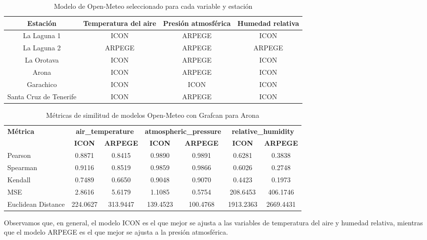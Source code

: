 \begin{table}[htb]
    \small
    \centering
    \begin{tabular}{|c|c|c|c|}
        \hline
        Estación & Temperatura del aire & Presión atmosférica & Humedad relativa \\
        \hline
        La Laguna 1 & ICON & ARPEGE & ICON \\
        La Laguna 2 & ARPEGE & ARPEGE & ARPEGE \\
        La Orotava & ICON & ARPEGE & ICON \\
        Arona & ICON & ARPEGE & ICON \\
        Garachico & ICON & ICON & ICON \\
        Santa Cruz de Tenerife & ICON & ARPEGE & ICON \\
        \hline
    \end{tabular}
    \caption{Modelo de Open-Meteo seleccionado para cada variable y estación}
    \label{tabla_modelos_seleccionados}
\end{table}

\begin{table}[h!]
\centering
\caption{Métricas de similitud de modelos Open-Meteo con Grafcan para Arona}
\label{tab:sim_metrics}
\footnotesize {
\begin{tabular}{l  cc  cc  cc}
\toprule
\textbf{Métrica} &
\multicolumn{2}{c}{\textbf{air\_temperature}} &
\multicolumn{2}{c}{\textbf{atmospheric\_pressure}} &
\multicolumn{2}{c}{\textbf{relative\_humidity}} \\
\cmidrule(lr){2-3} \cmidrule(lr){4-5} \cmidrule(lr){6-7}
 & \textbf{ICON} & \textbf{ARPEGE} & \textbf{ICON} & \textbf{ARPEGE} & \textbf{ICON} & \textbf{ARPEGE} \\
\midrule
Pearson               & 0.8871 & 0.8415 & 0.9890 & 0.9891 & 0.6281 & 0.3838 \\
Spearman              & 0.9116 & 0.8519 & 0.9859 & 0.9866 & 0.6026 & 0.2748 \\
Kendall               & 0.7489 & 0.6650 & 0.9048 & 0.9070 & 0.4423 & 0.1973 \\
MSE                   & 2.8616 & 5.6179 & 1.1085 & 0.5754 & 208.6453 & 406.1746 \\
Euclidean Distance    & 224.0627 & 313.9447 & 139.4523 & 100.4768 & 1913.2363 & 2669.4431 \\
\bottomrule
\end{tabular}
}
\end{table}


Observamos que, en general, el modelo ICON es el que mejor se ajusta a las variables de temperatura del aire y humedad relativa,
 mientras que el modelo ARPEGE es el que mejor se ajusta a la presión atmosférica.


